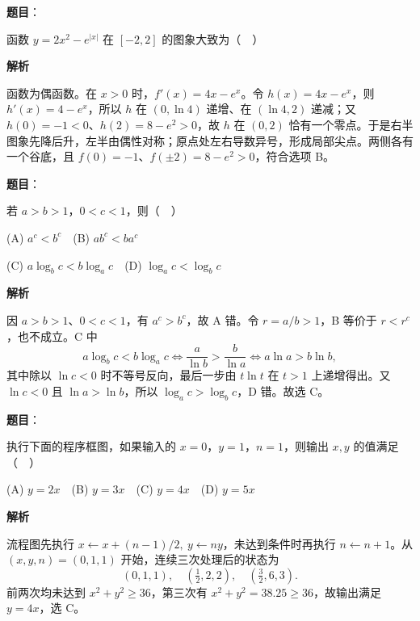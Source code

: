 \begin{answer}

\textbf{题目}：

函数 $y=2x^2-e^{|x|}$ 在 $[-2,2]$ 的图象大致为（　）
\nopagebreak[4]
\begin{center}\end{center}
\nopagebreak[4]
\textbf{解析}

函数为偶函数。在 \(x>0\) 时，\(f'(x)=4x-e^x\)。令 \(h(x)=4x-e^x\)，则 \(h'(x)=4-e^x\)，所以 \(h\) 在 \((0,\ln4)\) 递增、在 \((\ln4,2)\) 递减；又 \(h(0)=-1<0\)、\(h(2)=8-e^2>0\)，故 \(h\) 在 \((0,2)\) 恰有一个零点。于是右半图象先降后升，左半由偶性对称；原点处左右导数异号，形成局部尖点。两侧各有一个谷底，且 \(f(0)=-1\)、\(f(\pm2)=8-e^2>0\)，符合选项 B。


\end{answer}
\begin{answer}

\textbf{题目}：

若 $a>b>1$，$0<c<1$，则（　）

   (A) $a^c<b^c$　(B) $ab^c<ba^c$

   (C) $a\log_b c<b\log_a c$　(D) $\log_a c<\log_b c$

\textbf{解析}

因 \(a>b>1\)、\(0<c<1\)，有 \(a^c>b^c\)，故 A 错。令 \(r=a/b>1\)，B 等价于 \(r<r^c\)，也不成立。C 中
\nopagebreak[4]
\[
a\log_b c<b\log_a c
\iff \frac{a}{\ln b}>\frac{b}{\ln a}
\iff a\ln a>b\ln b,
\]
其中除以 \(\ln c<0\) 时不等号反向，最后一步由 \(t\ln t\) 在 \(t>1\) 上递增得出。又 \(\ln c<0\) 且 \(\ln a>\ln b\)，所以 \(\log_a c>\log_b c\)，D 错。故选 C。


\end{answer}
\begin{answer}

\textbf{题目}：

执行下面的程序框图，如果输入的 $x=0$，$y=1$，$n=1$，则输出 $x,y$ 的值满足（　）
\nopagebreak[4]
\begin{center}\end{center}
\nopagebreak[4]
   (A) $y=2x$　(B) $y=3x$　(C) $y=4x$　(D) $y=5x$


\textbf{解析}

流程图先执行 \(x\leftarrow x+(n-1)/2,\ y\leftarrow ny\)，未达到条件时再执行 \(n\leftarrow n+1\)。从 \((x,y,n)=(0,1,1)\) 开始，连续三次处理后的状态为
\nopagebreak[4]
\[
(0,1,1),\quad(\tfrac12,2,2),\quad(\tfrac32,6,3).
\]
前两次均未达到 \(x^2+y^2\ge36\)，第三次有 \(x^2+y^2=38.25\ge36\)，故输出满足 \(y=4x\)，选 C。


\end{answer}

